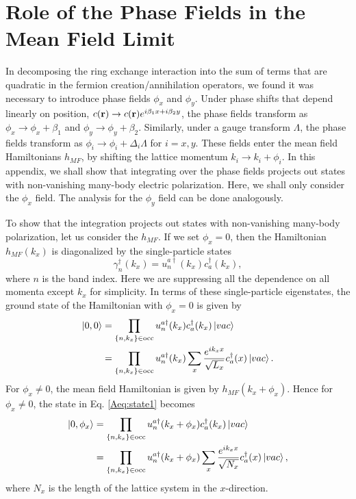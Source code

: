 \documentclass[prb,aps,twocolumn,groupaddress,floatfix]{revtex4-1}
\begin{document}
\section{Role of the Phase Fields in the Mean Field Limit}\label{app:PhaseFields}
In decomposing the ring exchange interaction into the sum of terms that are quadratic in the fermion creation/annihilation operators, we found it was necessary to introduce phase fields $\phi_x$ and $\phi_y$. Under phase shifts that depend linearly on position, $c({\bf{r}}) \rightarrow c({\bf{r}}) e^{i \beta_1 x + i \beta_2 y}$, the phase fields transform as $\phi_x \rightarrow \phi_x + \beta_1$ and  $\phi_y \rightarrow \phi_y + \beta_2$. Similarly, under a gauge transform $\Lambda$, the phase fields transform as $\phi_i \rightarrow \phi_i + \Delta_i \Lambda$ for $i = x,y$. These fields enter the mean field Hamiltonians $h_{MF}$, by shifting the lattice momentum $k_i \rightarrow k_i + \phi_i$. In this appendix, we shall show that integrating over the phase fields projects out states with non-vanishing many-body electric polarization. Here, we shall only consider the $\phi_x$ field. The analysis for the $\phi_y$ field can be done analogously. 

To show that the integration projects out states with non-vanishing many-body polarization, let us consider the $h_{MF}$. If we set $\phi_x = 0$, then the Hamiltonian $h_{MF}(k_x)$ is diagonalized by the single-particle states 
\begin{equation}
\gamma^\dagger_n(k_x) = u^{a\dagger}_n(k_x) c^\dagger_a(k_x),\label{Aeq:singlepartDef}
\end{equation} 
where $n$ is the band index. Here we are suppressing all the dependence on all momenta except $k_x$ for simplicity. In terms of these single-particle eigenstates, the ground state of the Hamiltonian with $\phi_x = 0$ is given by 
\begin{equation}
\begin{split}
\ket{0,0} &= \prod_{\{n,k_x\}\in \text{occ}} u^{a\dagger}_n(k_x) c^\dagger_a(k_x)\ket{vac}\\
&= \prod_{\{n,k_x\}\in \text{occ}} u^{a\dagger}_n(k_x) \sum_{x}\frac{e^{i k_x x}}{\sqrt{L_x}} c^\dagger_a(x)\ket{vac}.
\end{split}\label{Aeq:state1}
\end{equation}
For $\phi_x \neq 0$, the mean field Hamiltonian is given by $h_{MF}(k_x+\phi_x)$. Hence for $\phi_x\neq 0$, the state in Eq. \ref{Aeq:state1} becomes
\begin{equation}
\begin{split}
\ket{0,\phi_x} &= \prod_{\{n,k_x\}\in \text{occ}} u^{a\dagger}_n(k_x+\phi_x) c^\dagger_a(k_x)\ket{vac}\\
&= \prod_{\{n,k_x\}\in \text{occ}} u^{a\dagger}_n(k_x+\phi_x) \sum_{x}\frac{e^{i k_x x}}{\sqrt{N_x}} c^\dagger_a(x)\ket{vac},
\end{split}\label{Aeq:state2}
\end{equation}
where $N_x$ is the length of the lattice system in the $x$-direction. 
\end{document}
